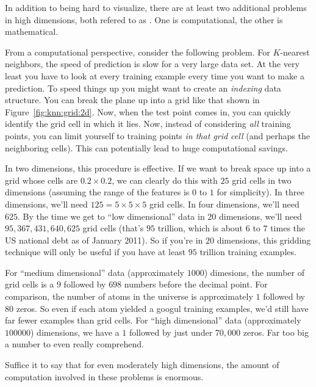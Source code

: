 In addition to being hard to visualize, there are at least two
additional problems in high dimensions, both refered to as
.  One is computational, the
other is mathematical.


From a computational perspective, consider the following problem.
For $K$-nearest neighbors, the speed of prediction is slow for a very
large data set.  At the very least you have to look at every training
example every time you want to make a prediction.  To speed things up
you might want to create an \emph{indexing} data structure.  You can
break the plane up into a grid like that shown in
Figure~\ref{fig:knn:grid:2d}.  Now, when the test point comes in, you can
quickly identify the grid cell in which it lies.  Now, instead of
considering \emph{all} training points, you can limit yourself to
training points \emph{in that grid cell} (and perhaps the neighboring
cells).  This can potentially lead to huge computational savings.

In two dimensions, this procedure is effective.  If we want to break
space up into a grid whose cells are $0.2 \times 0.2$, we can clearly
do this with $25$ grid cells in two dimensions (assuming the range of
the features is $0$ to $1$ for simplicity).  In three dimensions,
we'll need $125 = 5 \times 5 \times 5$ grid cells.  In four
dimensions, we'll need $625$.  By the time we get to ``low
dimensional'' data in $20$ dimensions, we'll need $95,367,431,640,625$
grid cells (that's $95$ trillion, which is about $6$ to $7$ times the
US national debt as of January 2011).  So if you're in $20$
dimensions, this gridding technique will only be useful if you have at
least $95$ trillion training examples.

For ``medium dimensional'' data (approximately $1000$) dimesions, the
number of grid cells is a $9$ followed by $698$ numbers before the
decimal point.  For comparison, the number of atoms in the universe is
approximately $1$ followed by $80$ zeros.  So even if each atom
yielded a googul training examples, we'd still have far fewer
examples than grid cells.  For ``high dimensional'' data
(approximately $100000$) dimensions, we have a $1$ followed by just
under $70,000$ zeros.  Far too big a number to even really comprehend.

Suffice it to say that for even moderately high dimensions, the amount
of computation involved in these problems is enormous.

